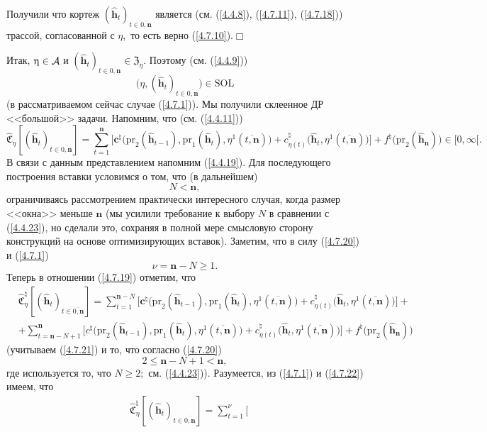 \documentclass[12pt]{report}
\newcommand{\bfn}{\begin{equation}}
\newcommand{\efn}{\end{equation}}
\newcommand{\ov}{\overline}
\newcommand{\ca}{{\cal A}}
\newcommand{\zc}{{\mathbf c}}
\newcommand{\nn}{{\mathbf n}}
\begin{document}
{{Получили что кортеж $(\hat{\mathbf{h}}_t)_{t\in\ov{0,\nn}}$ является (см. (\ref{4.4.8}),
(\ref{4.7.11}), (\ref{4.7.18})) трассой, согласованной с $\eta,$ то есть
верно (\ref{4.7.10}).\hfill$\Box$

Итак, $\eta\in\ca$ и $(\hat{\mathbf{h}}_t)_{t\in\ov{0,\nn}}\in \mathfrak{Z}_\eta.$
Поэтому (см. (\ref{4.4.9}))
$$\bigl(\eta,(\hat{\mathbf{h}}_t)_{t\in\ov{0,\nn}}\bigl)\in \mathrm{SOL}
$$
(в рассматриваемом сейчас случае (\ref{4.7.1})). Мы получили склеенное ДР <<большой>>
задачи. Напомним, что (см. (\ref{4.4.11}))
\bfn\label{4.7.19}\widehat{\mathfrak{C}}_\eta[(\hat{\mathbf{h}}_t)_{t\in\ov{0,\nn}}] =
\sum\limits_{t=1}^\nn\bigl[
\zc^\natural\bigl(\mathrm{pr}_2(\hat{\mathbf{h}}_{t-1}),\mathrm{pr}_1(\hat{\mathbf{h}}_t),
\eta^1(\ov{t,\nn})\bigl)+ c_{\eta(t)}^\natural\bigl(\hat{\mathbf{h}}_t,
\eta^1(\ov{t,\nn})\bigl)\bigl] +f^\natural\bigl(\mathrm{pr}_2(\hat{\mathbf{h}}_\nn)\bigl)\in [0,\infty[.
\efn
В связи с данным представлением напомним (\ref{4.4.19}). Для последующего построения
вставки условимся о том, что (в дальнейшем)
\bfn\label{4.7.20}N < \nn,
\efn
ограничиваясь рассмотрением практически интересного случая, когда размер <<окна>>
меньше $\nn$ (мы усилили требование к выбору $N$ в сравнении с (\ref{4.4.23}), но
сделали это, сохраняя в полной мере смысловую сторону конструкций на основе
оптимизирующих вставок). Заметим, что в силу (\ref{4.7.20}) и (\ref{4.7.1})
\bfn\label{4.7.21}\nu = \nn-N \geqslant 1.
\efn
Теперь в отношении (\ref{4.7.19}) отметим, что
\begin{eqnarray}
&\widehat{\mathfrak{C}}_\eta^\natural[(\hat{\mathbf{h}}_t)_{t\in\ov{0,\nn}}] =
\sum\limits_{t=1}^{\nn-N}\bigl[
\zc^\natural\bigl(\mathrm{pr}_2(\hat{\mathbf{h}}_{t-1}),\mathrm{pr}_1(\hat{\mathbf{h}}_t),
\eta^1(\ov{t,\nn})\bigl)+ c_{\eta(t)}^\natural\bigl(\hat{\mathbf{h}}_t,\eta^1(\ov{t,\nn})\bigl)\bigl] +
&\nonumber\\
&+ \sum\limits_{t=\nn-N+1}^\nn\bigl[
c^\natural\bigl(\mathrm{pr}_2(\hat{\mathbf{h}}_{t-1}),\mathrm{pr}_1(\hat{\mathbf{h}}_t),
\eta^1(\ov{t,\nn})\bigl)+ c_{\eta(t)}^\natural\bigl(\hat{\mathbf{h}}_t,\eta^1(\ov{t,\nn})\bigl)\bigl]
+f^\natural\bigl(\mathrm{pr}_2(\hat{\mathbf{h}}_\nn)\bigl)
&\label{4.7.22}
\end{eqnarray}
(учитываем (\ref{4.7.21}) и то, что согласно (\ref{4.7.20})
$$2 \leqslant \nn -N + 1 < \nn,
$$
где используется то, что $N \geqslant 2;$ см. (\ref{4.4.23})). Разумеется, из
(\ref{4.7.1}) и (\ref{4.7.22}) имеем, что
\begin{eqnarray}
&\widehat{\mathfrak{C}}_\eta^\natural[(\hat{\mathbf{h}}_t)_{t\in\ov{0,\nn}}] = \sum\limits_{t=1}^\nu\bigl[

\end{eqnarray}}}
\end{document}
